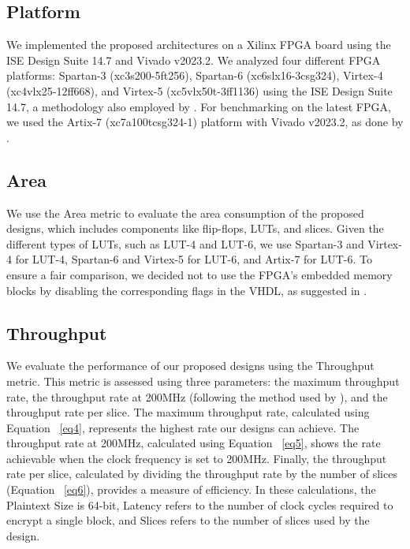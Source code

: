 \documentclass[sn-basic]{sn-jnl}%
\begin{document}
\subsection{Platform}\label{subsec4}

We implemented the proposed architectures on a Xilinx FPGA board using the ISE Design Suite 14.7 and Vivado v2023.2. 
We analyzed four different FPGA platforms: Spartan-3 (xc3s200-5ft256), Spartan-6 (xc6slx16-3csg324), Virtex-4 (xc4vlx25-12ff668), and Virtex-5 (xc5vlx50t-3ff1136) using the ISE Design Suite 14.7, a methodology also employed by \cite{lara2017lightweight}. 
For benchmarking on the latest FPGA, we used the Artix-7 (xc7a100tcsg324-1) platform with Vivado v2023.2, as done by \cite{mohajerani2020fpga}.


\subsection{Area}\label{subsec5}

We use the Area metric to evaluate the area consumption of the proposed designs, which includes components like flip-flops, LUTs, and slices. 
Given the different types of LUTs, such as LUT-4 and LUT-6, we use Spartan-3 and Virtex-4 for LUT-4, Spartan-6 and Virtex-5 for LUT-6, and Artix-7 for LUT-6. 
To ensure a fair comparison, we decided not to use the FPGA's embedded memory blocks by disabling the corresponding flags in the VHDL, as suggested in \cite{xilinx2022ultrafast}.

\subsection{Throughput}\label{subsec6}
We evaluate the performance of our proposed designs using the Throughput metric. 
This metric is assessed using three parameters: the maximum throughput rate, the throughput rate at 200MHz (following the method used by \cite{ghosh2017lightweight}), and the throughput rate per slice. 
The maximum throughput rate, calculated using Equation ~\ref{eq4}, represents the highest rate our designs can achieve. 
The throughput rate at 200MHz, calculated using Equation ~\ref{eq5}, shows the rate achievable when the clock frequency is set to 200MHz. 
Finally, the throughput rate per slice, calculated by dividing the throughput rate by the number of slices (Equation ~\ref{eq6}), provides a measure of efficiency. 
In these calculations, the Plaintext Size is 64-bit, Latency refers to the number of clock cycles required to encrypt a single block, and Slices refers to the number of slices used by the design.
\end{document}
